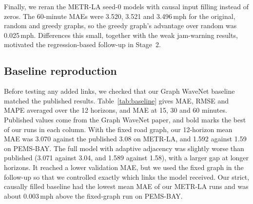 \documentclass[journal]{IEEEtran}
\newcommand{\ms}{\,mph}
\begin{document}
Finally, we reran the METR-LA seed-0 models with causal input filling instead of zeros. The 60-minute MAEs were 3.520, 3.521 and 3.496\ms{} for the original, random and greedy graphs, so the greedy graph's advantage over random was 0.025\ms{}. Differences this small, together with the weak jam-warning results, motivated the regression-based follow-up in Stage~2.

\subsection{Baseline reproduction}
Before testing any added links, we checked that our Graph WaveNet baseline matched the published results. Table~\ref{tab:baseline} gives MAE, RMSE and MAPE averaged over the 12 horizons, and MAE at 15, 30 and 60 minutes. Published values come from the Graph WaveNet paper, and bold marks the best of our runs in each column. With the fixed road graph, our 12-horizon mean MAE was 3.070 against the published 3.08 on METR-LA, and 1.592 against 1.59 on PEMS-BAY. The full model with adaptive adjacency was slightly worse than published (3.071 against 3.04, and 1.589 against 1.58), with a larger gap at longer horizons. It reached a lower validation MAE, but we used the fixed graph in the follow-up so that we controlled exactly which links the model received. Our strict, causally filled baseline had the lowest mean MAE of our METR-LA runs and was about 0.003\ms{} above the fixed-graph run on PEMS-BAY.
\end{document}
